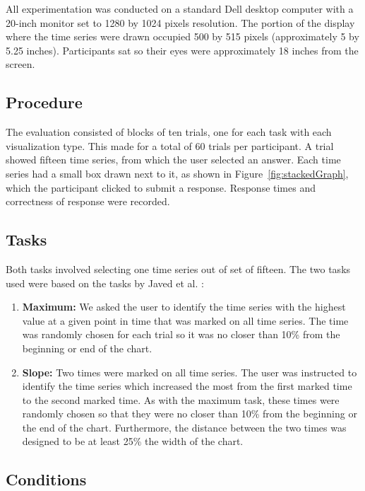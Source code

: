 \documentclass{article}
\begin{document}
All experimentation was conducted on a standard Dell desktop computer with a 20-inch monitor set to 1280 by 1024 pixels resolution.  The portion of the display where the time series were drawn occupied 500 by 515 pixels (approximately 5 by 5.25 inches).  Participants sat so their eyes were approximately 18 inches from the screen.

\subsection{Procedure}

The evaluation consisted of blocks of ten trials, one for each task with each visualization type.  This made for a total of 60 trials per participant.  A trial showed fifteen time series, from which the user selected an answer.  Each time series had a small box drawn next to it, as shown in Figure~\ref{fig:stackedGraph}, which the participant clicked to submit a response.  Response times and correctness of response were recorded.

\subsection{Tasks}

Both tasks involved selecting one time series out of set of fifteen.  The two tasks used were based on the tasks by Javed et al. \cite{javed2010}:
\begin{enumerate}
\item \textbf{Maximum:} We asked the user to identify the time series with the highest value at a given point in time that was marked on all time series.  The time was randomly chosen for each trial so it was no closer than 10\% from the beginning or end of the chart.
\item \textbf{Slope:} Two times were marked on all time series.  The user was instructed to identify the time series which increased the most from the first marked time to the second marked time.  As with the maximum task, these times were randomly chosen so that they were no closer than 10\% from the beginning or the end of the chart.  Furthermore, the distance between the two times was designed to be at least 25\% the width of the chart.
\end{enumerate}

\subsection{Conditions}
\end{document}
